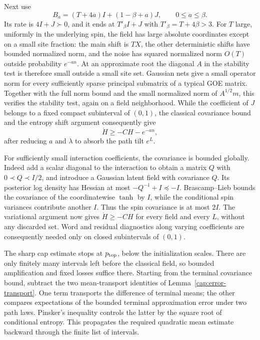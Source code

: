Next use
\[
 B_a=(T+4a)I+(1-\beta+a)J,\qquad 0\le a\le\beta.
\]
Its rate is $4I+J\succ0$, and it ends at
$T'_\beta I+J$ with $T'_\beta=T+4\beta>3$. For $T$ large, uniformly in the underlying spin, the field has large
absolute coordinates except on a small site fraction: the main shift is $TX$,
the other deterministic shifts have bounded normalized norm, and the noise has
squared normalized norm $O(T)$ outside probability $e^{-an}$. At an
approximate root the diagonal $A$ in the stability test is therefore small
outside a small site set. Gaussian nets give a small operator norm for every
sufficiently sparse principal submatrix of a typical GOE matrix. Together with
the full norm bound and the small normalized norm of $A^{1/2}m$, this verifies
the stability test, again on a field neighborhood. While the coefficient of
$J$ belongs to a fixed compact subinterval of $(0,1)$, the classical
covariance bound and the entropy shift argument consequently give
\begin{equation}\label{cap:constant-entropy-ode}
 \dot H\ge-CH-e^{-an},
\end{equation}
after reducing $a$ and $\lambda$ to absorb the path tilt $e^L$.

For sufficiently small interaction coefficients, the covariance is bounded
globally. Indeed add a scalar diagonal to the interaction to obtain a matrix
$Q$ with $0\prec Q\prec I/2$, and introduce a Gaussian latent field with
covariance $Q$. Its posterior log density has Hessian at most
$-Q^{-1}+I\preceq-I$. Brascamp--Lieb bounds the covariance of the
coordinatewise $\tanh$ by $I$, while the conditional spin variances contribute
another $I$. Thus the spin covariance is at most $2I$. The variational
argument now gives $\dot H\ge-CH$ for every field and every $L$, without any
discarded set. Word and residual diagnostics along varying coefficients are
consequently needed only on closed subintervals of $(0,1)$.

The sharp cap estimate stops at $p_{\rm top}$, below the initialization
scales. There are only finitely many intervals left before the classical
field, so bounded amplification and fixed losses suffice there. Starting from
the terminal covariance bound, subtract the two mean-transport identities of
Lemma~\ref{cap:error-transport}. One term transports the difference of
terminal means; the other compares expectations of the bounded terminal
approximation error under two path laws. Pinsker's inequality controls the
latter by the square root of conditional entropy. This propagates the required
quadratic mean estimate backward through the finite list of intervals.

